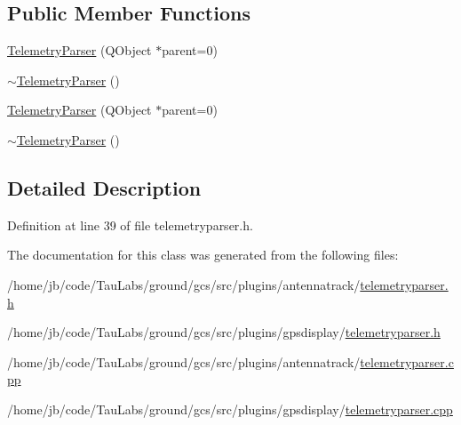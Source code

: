 \subsection*{\-Public \-Member \-Functions}
\begin{DoxyCompactItemize}
\item 
\hyperlink{group___antenna_track_gadget_plugin_ga0a989a67079a7e06f5034415c751b46c}{\-Telemetry\-Parser} (\-Q\-Object $\ast$parent=0)
\item 
\hyperlink{group___antenna_track_gadget_plugin_ga9a05a4fb6f18cdc568bc4e8f52534977}{$\sim$\-Telemetry\-Parser} ()
\item 
\hyperlink{group___g_p_s_gadget_plugin_ga0a989a67079a7e06f5034415c751b46c}{\-Telemetry\-Parser} (\-Q\-Object $\ast$parent=0)
\item 
\hyperlink{group___g_p_s_gadget_plugin_ga9a05a4fb6f18cdc568bc4e8f52534977}{$\sim$\-Telemetry\-Parser} ()
\end{DoxyCompactItemize}


\subsection{\-Detailed \-Description}


\-Definition at line 39 of file telemetryparser.\-h.



\-The documentation for this class was generated from the following files\-:\begin{DoxyCompactItemize}
\item 
/home/jb/code/\-Tau\-Labs/ground/gcs/src/plugins/antennatrack/\hyperlink{antennatrack_2telemetryparser_8h}{telemetryparser.\-h}\item 
/home/jb/code/\-Tau\-Labs/ground/gcs/src/plugins/gpsdisplay/\hyperlink{gpsdisplay_2telemetryparser_8h}{telemetryparser.\-h}\item 
/home/jb/code/\-Tau\-Labs/ground/gcs/src/plugins/antennatrack/\hyperlink{antennatrack_2telemetryparser_8cpp}{telemetryparser.\-cpp}\item 
/home/jb/code/\-Tau\-Labs/ground/gcs/src/plugins/gpsdisplay/\hyperlink{gpsdisplay_2telemetryparser_8cpp}{telemetryparser.\-cpp}\end{DoxyCompactItemize}
